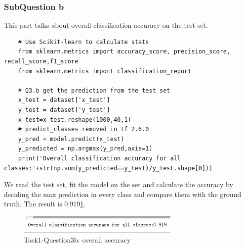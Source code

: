 \documentclass[conference]{IEEEtran}
\begin{document}
\subsubsection{SubQuestion b}
This part talks about overall classification accuracy on the test set.
\begin{lstlisting}
    # Use Scikit-learn to calculate stats
    from sklearn.metrics import accuracy_score, precision_score, recall_score,f1_score
    from sklearn.metrics import classification_report

    # Q3.b get the prediction from the test set
    x_test = dataset['x_test']
    y_test = dataset['y_test']
    x_test=x_test.reshape(1000,40,1)
    # predict_classes removed in tf 2.6.0
    y_pred = model.predict(x_test)
    y_predicted = np.argmax(y_pred,axis=1)
    print('Overall classification accuracy for all classes:'+str(np.sum(y_predicted==y_test)/y_test.shape[0]))
\end{lstlisting}
We read the test set, fit the model on the set and calculate the accuracy by deciding the max prediction in every class and compare them with the ground truth. The result is 0.919\ref{Fig.t1q3b}.

\begin{figure}[H] 
    \centering %
    \includegraphics[width=0.7\textwidth]{T1Q3b.png} %
    \caption{Task1-Question3b: overall accuracy} %
    \label{Fig.t1q3b} %
\end{figure}
\end{document}
